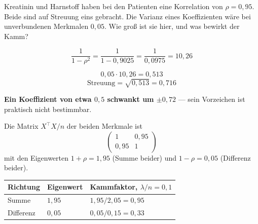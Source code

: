 \begin{aufgabe}
\begin{center}
\begin{minipage}{0.88\textwidth}
\end{minipage}
\end{center}
\end{aufgabe}

\begin{aufgabe}
Kreatinin und Harnstoff haben bei den Patienten eine Korrelation von $\rho = 0{,}95$. Beide sind auf Streuung eins gebracht. Die Varianz eines Koeffizienten wäre bei unverbundenen Merkmalen $0{,}05$. Wie groß ist sie hier, und was bewirkt der Kamm?

\loesung
{}
\[ \frac{1}{1-\rho^{2}} = \frac{1}{1-0{,}9025} = \frac{1}{0{,}0975} = 10{,}26 \]

\[ 0{,}05\cdot10{,}26 = 0{,}513 \]
\[ \text{Streuung} = \sqrt{0{,}513} = 0{,}716 \]

\begin{center}
\begin{minipage}{0.9\textwidth}
\textbf{Ein Koeffizient von etwa $0{,}5$ schwankt um $\pm0{,}72$} --- sein Vorzeichen ist praktisch nicht bestimmbar.
\end{minipage}
\end{center}

Die Matrix $X^{\!\top}X/n$ der beiden Merkmale ist
\[ \begin{pmatrix} 1 & 0{,}95\\ 0{,}95 & 1\end{pmatrix} \]
mit den Eigenwerten $1+\rho = 1{,}95$ (Summe beider) und $1-\rho = 0{,}05$ (Differenz beider).

\begin{center}
{\small
\renewcommand{\arraystretch}{1.5}
\begin{tabular}{@{}P{2.6cm}P{1.8cm}P{3.2cm}@{}}
\toprule
\textbf{Richtung} & \textbf{Eigenwert} & \textbf{Kammfaktor, $\lambda/n = 0{,}1$}\\
\midrule
Summe & $1{,}95$ & $1{,}95/2{,}05 = 0{,}95$\\
Differenz & $0{,}05$ & $0{,}05/0{,}15 = 0{,}33$\\
\bottomrule
\end{tabular}}
\end{center}


\end{aufgabe}
